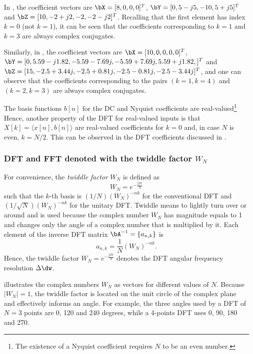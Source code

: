 In , the coefficient vectors are $\bX = [8, 0, 0, 0]^T$, $\bY = [0, 5-j5, -10, 5+j5]^T$ and $\bZ = [10, -2+j2, -2, -2-j2]^T$. Recalling that the first element has index $k=0$ (not $k=1$), it  can be seen that 
the coefficients corresponding to $k=1$ and $k=3$ are always complex conjugates.

Similarly, in , the coefficient vectors are $\bX = [10, 0, 0, 0, 0]^T$, $\bY = [0, 5.59-j1.82, -5.59-7.69j, -5.59+7.69j, 5.59+j1.82,]^T$ and $\bZ = [15, -2.5+3.44j, -2.5+0.81j,  -2.5-0.81j, -2.5-3.44j]^T$, 
and one can observe that 
the coefficients corresponding to the pairs $(k=1, k=4)$ and $(k=2, k=3)$ are always complex conjugates.
\eExample 

The basis functions $b[n]$ for the DC and Nyquist coefficients are real-valued\footnote{The existence of a Nyquist coefficient
requires $N$ to be an even number.}
Hence, another property of the DFT for real-valued inputs is that 
$X[k]=\langle x[n], b[n] \rangle$ are real-valued coefficients for $k=0$ and, in case $N$ is even, $k=N/2$.
This can be observed in the DFT coefficients discussed in .

\subsubsection{{\akadvanced} DFT and FFT denoted with the twiddle factor $W_N$}

For convenience, the \emph{twiddle factor} $W_N$ is defined as
\begin{equation}
W_N = e^{-\frac {j2\pi} N}
\label{eq:twiddle_factor}
\end{equation}
such that the $k$-th basis is $(1/N) \left(W_N \right)^{-nk}$ for the conventional DFT and 
$(1/\sqrt{N})\left(W_N \right)^{-nk}$ for the unitary DFT. Twiddle means to lightly turn over or around and is used because the complex number $W_N$ has magnitude equals to 1 and changes only the angle of a complex number that is multiplied by it.
Each element of the inverse DFT matrix $\bA^{-1} = \{ a_{n,k} \}$ is
\[
a_{n,k} = \frac{1}{N} \left(W_N \right)^{-nk}.
\]
Hence, the twiddle factor $W_N = e^{-\frac {j2\pi} N}$ denotes the 
DFT angular frequency resolution $\Delta \dw$.

 illustrates the complex numbers $W_N$ as vectors for different values of $N$. Because $|W_N|=1$, the twiddle factor is located on the unit circle of the complex plane and effectively informs an angle. For example, the three angles used by a DFT of $N=3$ points are 0, 120 and 240 degrees, while a 4-points DFT uses 0, 90, 180 and 270.



